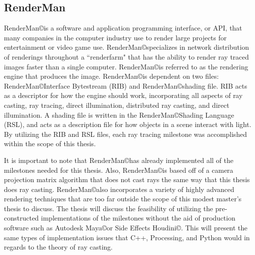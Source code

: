 \subsection{RenderMan}
\label{sub:RenderMan}
RenderMan\copyright\space is a software and application programming interface, or API, that many companies in the computer industry use to render large projects for entertainment or video game use.  RenderMan\copyright\space specializes in network distribution of renderings throughout a ``renderfarm" that has the ability to render ray traced images faster than a single computer.  RenderMan\copyright\space is referred to as the rendering engine that produces the image.  RenderMan\copyright\space is dependent on two files: RenderMan\copyright\space Interface Bytestream (RIB) and RenderMan\copyright\space shading file.  RIB acts as a descriptor for how the engine should work, incorporating all aspects of ray casting, ray tracing, direct illumination, distributed ray casting, and direct illumination.  A shading file is written in the RenderMan\copyright\space Shading Language (RSL), and acts as a description file for how objects in a scene interact with light.  By utilizing the RIB and RSL files, each ray tracing milestone was accomplished within the scope of this thesis.

It is important to note that RenderMan\copyright\space has already implemented all of the milestones needed for this thesis.  Also, RenderMan\copyright\space is based off of a camera projection matrix algorithm that does not cast rays the same way that this thesis does ray casting.  RenderMan\copyright\space also incorporates a variety of highly advanced rendering techniques that are too far outside the scope of this modest master's thesis to discuss.  The thesis will discuss the feasibility of utilizing the pre-constructed implementations of the milestones without the aid of production software such as Autodesk Maya\copyright\space or  Side Effects Houdini\copyright\space. This will present the same types of implementation issues that C++, Processing, and Python would in regards to the theory of ray casting. 